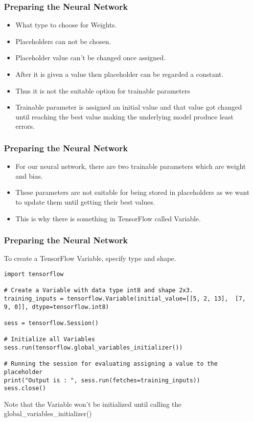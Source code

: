 \begin{frame}[fragile] \frametitle{Preparing the Neural Network }

\begin{itemize}
\item What type to choose for Weights.
\item Placeholders can not be chosen.
\item Placeholder value can't be changed once assigned. 
\item After it is given a value then placeholder can be regarded a constant. 
\item Thus it is not the suitable option for trainable parameters
\item Trainable parameter is assigned an initial value and that value got changed until reaching the best value making the underlying model produce least errors.
\end{itemize}

\end{frame}

\begin{frame}[fragile] \frametitle{Preparing the Neural Network }

\begin{itemize}
\item For our neural network, there are two trainable parameters which are weight and bias.
\item These parameters are not suitable for being stored in placeholders as we want to update them until getting their best values. 
\item This is why there is something in TensorFlow called Variable.
\end{itemize}

\end{frame}

\begin{frame}[fragile] \frametitle{Preparing the Neural Network }

To create a TensorFlow Variable, specify type and shape.
\begin{lstlisting}
import tensorflow  

# Create a Variable with data type int8 and shape 2x3. 
training_inputs = tensorflow.Variable(initial_value=[[5, 2, 13],  [7, 9, 0]], dtype=tensorflow.int8)

sess = tensorflow.Session() 

# Initialize all Variables  
sess.run(tensorflow.global_variables_initializer())  

# Running the session for evaluating assigning a value to the placeholder  
print("Output is : ", sess.run(fetches=training_inputs))  
sess.close() 
\end{lstlisting}
Note that the Variable won't be initialized until calling the global\_variables\_initializer() 
\end{frame}


